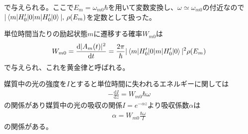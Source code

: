 \documentclass[11pt,b5paper,papersize,dvipdfmx]{jsbook}
\begin{document}
で与えられる。ここで$E_m = \omega_{m0}\hbar$を用いて変数変換し、$\omega \simeq \omega_{m0}$の付近なので$|\braket{m|H'_0|0}|,\,\rho(E_m)$を定数として扱った。\par
単位時間当たりの励起状態$m$に遷移する確率$W_{m0}$は
\begin{align}
    W_{m0} = \frac{\mathrm{d}|A_m(t)|^2}{\mathrm{d}t} = \frac{2\pi}{\hbar}|\braket{m|H'_0|0}|^2\rho(E_m)
    \label{eq:golden}
\end{align}
で与えられ、これを黄金律と呼ばれる。\par
媒質中の光の強度を$I$とすると単位時間に失われるエネルギーに関しては
\begin{align}
　-\frac{\mathrm{d}I}{\mathrm{d}z} = W_{m0}\hbar\omega
\end{align}
の関係があり媒質中の光の吸収の関係$I = e^{-\alpha z}$より吸収係数$\alpha$は
\begin{align}
    \alpha = W_{m0}\frac{\hbar \omega}{I}
\end{align}
の関係がある。
\end{document}
